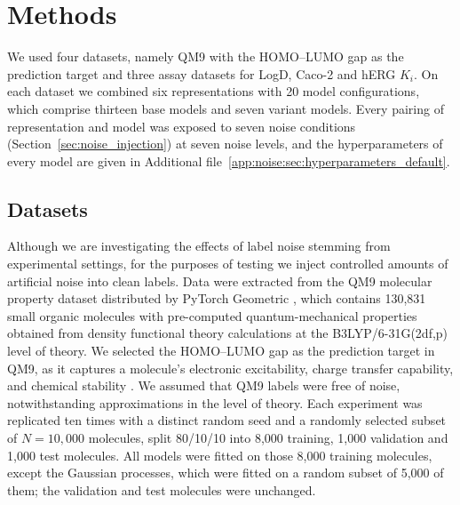 \section{Methods}\label{sec:robustness:methods}

We used four datasets, namely QM9 with the HOMO--LUMO gap as the prediction target and three assay datasets for LogD, Caco-2 and hERG $K_i$. On each dataset we combined six representations with 20 model configurations, which comprise thirteen base models and seven variant models. Every pairing of representation and model was exposed to seven noise conditions (Section~\ref{sec:noise_injection}) at seven noise levels, and the hyperparameters of every model are given in Additional file~\ref{app:noise:sec:hyperparameters_default}.



\subsection{Datasets}

Although we are investigating the effects of label noise stemming from experimental settings, for the purposes of testing we inject controlled amounts of artificial noise into clean labels. Data were extracted from the QM9 molecular property dataset distributed by PyTorch Geometric \citep{Ramakrishnan2014}, which contains 130,831 small organic molecules with pre-computed quantum-mechanical properties obtained from density functional theory calculations at the B3LYP/6-31G(2df,p) level of theory. We selected the HOMO--LUMO gap as the prediction target in QM9, as it captures a molecule's electronic excitability, charge transfer capability, and chemical stability \citep{Fediai2023}. We assumed that QM9 labels were free of noise, notwithstanding approximations in the level of theory. Each experiment was replicated ten times with a distinct random seed and a randomly selected subset of $N = 10{,}000$ molecules, split 80/10/10 into 8,000 training, 1,000 validation and 1,000 test molecules. All models were fitted on those 8,000 training molecules, except the Gaussian processes, which were fitted on a random subset of 5,000 of them; the validation and test molecules were unchanged.

